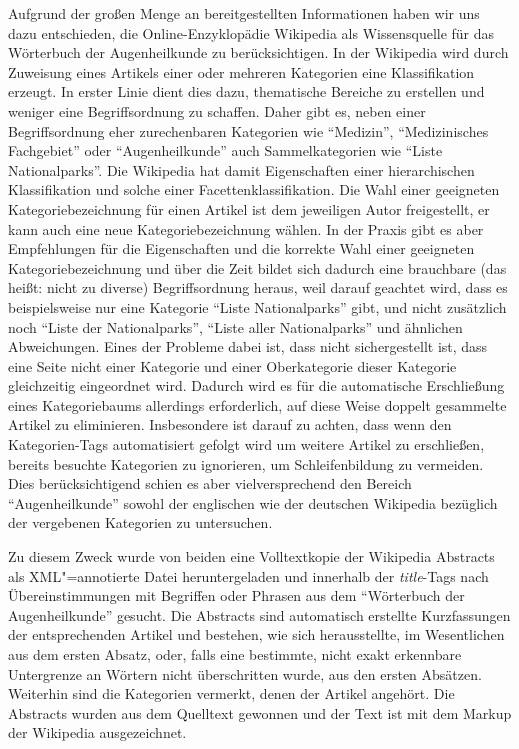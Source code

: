 \documentclass[pagesize,DIV=calc,12pt,final]{scrreprt}
\begin{document}
Aufgrund der großen Menge an bereitgestellten Informationen haben wir uns dazu entschieden, die Online-Enzyklopädie Wikipedia als Wissensquelle für das Wörterbuch der Augenheilkunde zu berücksichtigen. 
In der Wikipedia wird durch Zuweisung eines Artikels einer oder mehreren Kategorien eine Klassifikation erzeugt. 
In erster Linie dient dies dazu, thematische Bereiche zu erstellen und weniger eine Begriffsordnung zu schaffen. 
Daher gibt es, neben einer Begriffsordnung eher zurechenbaren Kategorien wie \enquote{Medizin}, \enquote{Medizinisches Fachgebiet} oder \enquote{Augenheilkunde} auch Sammelkategorien wie \enquote{Liste Nationalparks}. 
Die Wikipedia hat damit Eigenschaften einer hierarchischen Klassifikation und solche einer Facettenklassifikation. 
Die Wahl einer geeigneten Kategoriebezeichnung für einen Artikel ist dem jeweiligen Autor freigestellt, er kann auch eine neue Kategoriebezeichnung wählen. 
In der Praxis gibt es aber Empfehlungen für die Eigenschaften und die korrekte Wahl einer geeigneten Kategoriebezeichnung und über die Zeit bildet sich dadurch eine brauchbare (das heißt: nicht zu diverse) Begriffsordnung heraus, weil darauf geachtet wird, dass es beispielsweise nur eine Kategorie \enquote{Liste Nationalparks} gibt, und nicht zusätzlich noch \enquote{Liste der Nationalparks}, \enquote{Liste aller Nationalparks} und ähnlichen Abweichungen. 
Eines der Probleme dabei ist, dass nicht sichergestellt ist, dass eine Seite nicht einer Kategorie und einer Oberkategorie dieser Kategorie gleichzeitig eingeordnet wird. 
Dadurch wird es für die automatische Erschließung eines Kategoriebaums allerdings erforderlich, auf diese Weise doppelt gesammelte Artikel zu eliminieren. 
Insbesondere ist darauf zu achten, dass wenn den Kategorien-Tags automatisiert gefolgt wird um weitere Artikel zu erschließen, bereits besuchte Kategorien zu ignorieren, um Schleifenbildung zu vermeiden. 
Dies berücksichtigend schien es aber vielversprechend den Bereich \enquote{Augenheilkunde} sowohl der englischen wie der deutschen Wikipedia bezüglich der vergebenen Kategorien zu untersuchen. 

Zu diesem Zweck wurde von beiden eine Volltextkopie der Wikipedia Abstracts als XML"=annotierte Datei heruntergeladen und innerhalb der \textit{title}-Tags nach Übereinstimmungen mit Begriffen oder Phrasen aus dem \enquote{Wörterbuch der Augenheilkunde} gesucht. 
Die Abstracts sind automatisch erstellte Kurzfassungen der entsprechenden Artikel und bestehen, wie sich herausstellte, im Wesentlichen aus dem ersten Absatz, oder, falls eine bestimmte, nicht exakt erkennbare Untergrenze an Wörtern nicht überschritten wurde, aus den ersten Absätzen. 
Weiterhin sind die Kategorien vermerkt, denen der Artikel angehört. 
Die Abstracts wurden aus dem Quelltext gewonnen und der Text ist mit dem Markup der Wikipedia ausgezeichnet. 
\end{document}
